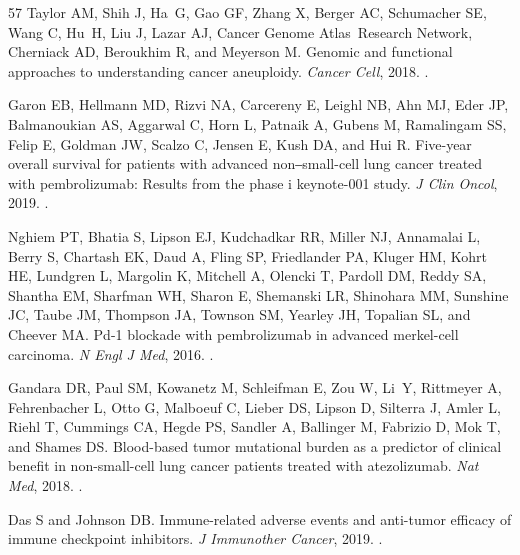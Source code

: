 \documentclass[11pt]{article}
\begin{document}
\begin{thebibliography}{57}
Taylor AM, Shih J, Ha~G, Gao GF, Zhang X, Berger AC, Schumacher SE, Wang C,
  Hu~H, Liu J, Lazar AJ, Cancer Genome Atlas~Research Network, Cherniack AD,
  Beroukhim R, and Meyerson M.
\newblock Genomic and functional approaches to understanding cancer aneuploidy.
\newblock \emph{Cancer Cell}, 2018.
\newblock {}.

Garon EB, Hellmann MD, Rizvi NA, Carcereny E, Leighl NB, Ahn MJ, Eder JP,
  Balmanoukian AS, Aggarwal C, Horn L, Patnaik A, Gubens M, Ramalingam SS,
  Felip E, Goldman JW, Scalzo C, Jensen E, Kush DA, and Hui R.
\newblock Five-year overall survival for patients with advanced
  non‒small-cell lung cancer treated with pembrolizumab: Results from the
  phase i keynote-001 study.
\newblock \emph{J Clin Oncol}, 2019.
\newblock {}.

Nghiem PT, Bhatia S, Lipson EJ, Kudchadkar RR, Miller NJ, Annamalai L, Berry S,
  Chartash EK, Daud A, Fling SP, Friedlander PA, Kluger HM, Kohrt HE, Lundgren
  L, Margolin K, Mitchell A, Olencki T, Pardoll DM, Reddy SA, Shantha EM,
  Sharfman WH, Sharon E, Shemanski LR, Shinohara MM, Sunshine JC, Taube JM,
  Thompson JA, Townson SM, Yearley JH, Topalian SL, and Cheever MA.
\newblock Pd-1 blockade with pembrolizumab in advanced merkel-cell carcinoma.
\newblock \emph{N Engl J Med}, 2016.
\newblock {}.

Gandara DR, Paul SM, Kowanetz M, Schleifman E, Zou W, Li~Y, Rittmeyer A,
  Fehrenbacher L, Otto G, Malboeuf C, Lieber DS, Lipson D, Silterra J, Amler L,
  Riehl T, Cummings CA, Hegde PS, Sandler A, Ballinger M, Fabrizio D, Mok T,
  and Shames DS.
\newblock Blood-based tumor mutational burden as a predictor of clinical
  benefit in non-small-cell lung cancer patients treated with atezolizumab.
\newblock \emph{Nat Med}, 2018.
\newblock {}.

Das S and Johnson DB.
\newblock Immune-related adverse events and anti-tumor efficacy of immune
  checkpoint inhibitors.
\newblock \emph{J Immunother Cancer}, 2019.
\newblock {}.


\end{thebibliography}
\end{document}
